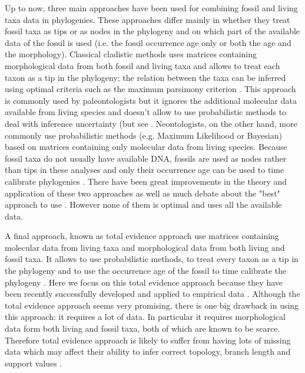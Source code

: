 \documentclass[12pt,letterpaper]{article}
\begin{document}
Up to now, three main approaches have been used for combining fossil and living taxa data in phylogenies.
These approaches differ mainly in whether they treat fossil taxa as tips or as nodes in the phylogeny and on which part of the available data of the fossil is used (i.e. the fossil occurrence age only or both the age and the morphology).
Classical cladistic methods uses matrices containing morphological data from both fossil and living taxa and allows to treat each taxon as a tip in the phylogeny; the relation between the taxa can be inferred using optimal criteria such as the maximum parsimony criterion \citep{simpson1945}.
This approach is commonly used by paleontologists but it ignores the additional molecular data available from living species and doesn't allow to use probabilistic methods to deal with inference uncertainty (but see \citet{spencerefficacy2013}.
Neontologists, on the other hand, more commonly use probabilistic methods (e.g. Maximum Likelihood or Bayesian) based on matrices containing only molecular data from living species.
Because fossil taxa do not usually have available DNA, fossils are used as nodes rather than tips in these analyses and only their occurrence age can be used to time calibrate phylogenies \citep{zuckerkandl1965}.
There have been great improvements in the theory and application of these two approaches \citep[e.g.][]{bapsta2013,stadlerdating2013,heaththe2013} as well as much debate about the "best" approach to use \citep[e.g.][]{spencerefficacy2013}.
However none of them is optimal and uses all the available data.

A final approach, known as total evidence approach use matrices containing molecular data from living taxa and morphological data from both living and fossil taxa. %
It allows to use probabilistic methods, to treat every taxon as a tip in the phylogeny and to use the occurrence age of the fossil to time calibrate the phylogeny \citep{eernissetaxonomic1993}.
Here we focus on this total evidence approach because they have been recently successfully developed and applied to empirical data \citep{pyrondivergence2011,ronquista2012,schragocombining2013}.  %
Although the total evidence approach seems very promising, there is one big drawback in using this approach: it requires a lot of data.
In particular it requires morphological data form both living and fossil taxa, both of which are known to be scarce.
Therefore total evidence approach is likely to suffer from having lots of missing data which may affect their ability to infer correct topology, branch length and support values \citep{salamin2003}. %
\end{document}
